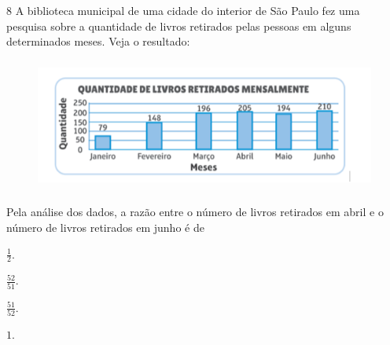 
\num{8}  A biblioteca municipal de uma cidade do interior de São Paulo fez uma
pesquisa sobre a quantidade de livros retirados pelas pessoas em alguns
determinados meses. Veja o resultado:

\begin{figure}[H]
\centering
\includegraphics[width=5in,height=1.71875in]{./imgSAEB_6_MAT/media/image117.png}
\end{figure}

Pela análise dos dados, a razão entre o número de livros retirados em
abril e o número de livros retirados em junho é de

\begin{escolha}
\item $\frac{1}{2}$.
\item $\frac{52}{51}$.
\item $\frac{51}{52}$.
\item $1$.
\end{escolha}


